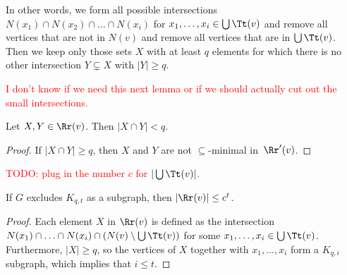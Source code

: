 In other
words, we form all possible intersections $N(x_1)\cap N(x_2)\cap\ldots
\cap N(x_i)$ for $x_1,\ldots, x_i\in \bigcup \Tt(v)$ and remove
all vertices that are not in $N(v)$ and remove all vertices that
are in $\bigcup\Tt(v)$. Then we keep only those sets $X$ with at
least $q$
elements for which there is no other intersection $Y\subsetneq X$
with $|Y|\geq q$.

%


\textcolor{red}{I don't know if we need this next lemma
or if we should actually
cut out the small intersections.}
\begin{lemma}
Let $X,Y\in \Rr(v)$. Then $|X\cap Y|<q$.
\end{lemma}
\begin{proof}
If $|X\cap Y|\geq q$, then $X$ and $Y$ are not $\subseteq$-minimal
in~$\Rr'(v)$.
\end{proof}

\textcolor{red}{TODO: plug in the number $c$ for $|\bigcup\Tt(v)|$.}

\begin{lemma}
If $G$ excludes $K_{q,t}$ as a subgraph, then
$|\Rr(v)|\leq c^t$.
\end{lemma}
\begin{proof}
Each element $X$ in $\Rr(v)$ is defined as the intersection
$N(x_1)\cap\ldots\cap N(x_i)\cap (N(v)\setminus \bigcup\Tt(v))$
for some $x_1,\ldots, x_i\in \bigcup\Tt(v)$. Furthermore,
$|X|\geq q$, so the vertices of $X$ together with $x_1, \ldots, x_i$
form a $K_{q,i}$ subgraph, which implies that $i\leq t$.
\end{proof}


